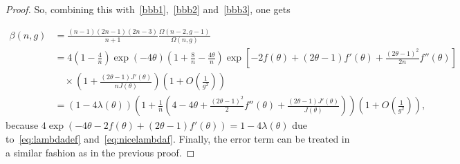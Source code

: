 \documentclass[10pt,a4paper]{amsart}
\newcommand{\bigO}[1]{O\left({#1}\right)}
\newcommand{\bigpar}[1]{\left({#1}\right)}
\begin{document}
\begin{proof}
So, combining this with~\eqref{bbb1},~\eqref{bbb2} and~\eqref{bbb3}, one gets

\begin{align*}
\beta(n,g)
    &=\frac{(n-1)(2n-1)(2n-3)}{n+1}\frac{\Omega(n-2,g-1)}{\Omega(n,g)}\\
    &=4\left(1-\frac{4}{n}\right)\exp(-4\theta)\left(1+\frac{8}{n}-\frac{4\theta}{n}\right)\exp\left[-2f(\theta)+(2\theta-1)f'(\theta)+\frac{(2\theta-1)^2}{2n}f''(\theta)\right]\\
    &\quad\times\left(1+\frac{(2\theta-1)J'\left(\theta\right)}{nJ\left(\theta\right)}\right)\bigpar{1+\bigO{\frac{1}{g^2}}}\\
    &=(1-4\lambda(\theta))\left(1+\frac{1}{n}\left(4-4\theta+\frac{(2\theta-1)^2}{2}f''(\theta)+\frac{(2\theta-1)J'\left(\theta\right)}{J\left(\theta\right)}\right)\right)\bigpar{1+\bigO{\frac{1}{g^2}}},
\end{align*}
because $4\exp(-4\theta-2f(\theta)+(2\theta-1)f'(\theta))=1-4\lambda(\theta)$ due to~\eqref{eq:lambdadef} and~\eqref{eq:nicelambdaf}.
Finally, the error term can be treated in a similar fashion as in the previous proof.
\end{proof}
\end{document}
